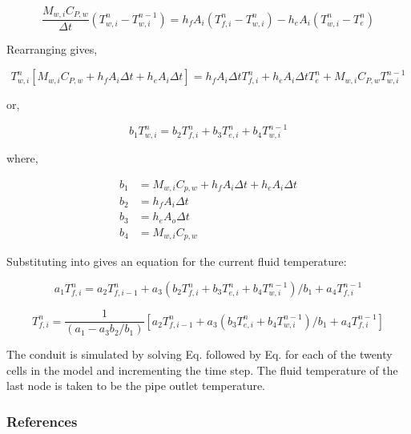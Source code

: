 \begin{equation}
\frac{{{M_{w,i}}{C_{P,w}}}}{{\Delta t}}\left( {T_{w,i}^n - T_{w,i}^{n - 1}} \right) = {h_f}{A_i}\left( {T_{f,i}^n - T_{w,i}^n} \right) - {h_e}{A_i}\left( {T_{w,i}^n - T_e^n} \right)
\end{equation}

Rearranging gives,

\begin{equation}
T_{w,i}^n\left[ {{M_{w,i}}{C_{P,w}} + {h_f}{A_i}\Delta t + {h_e}{A_i}\Delta t} \right] = {h_f}{A_i}\Delta tT_{f,i}^n + {h_e}{A_i}\Delta tT_e^n + {M_{w,i}}{C_{P,w}}T_{w,i}^{n - 1}
\end{equation}

or,

\begin{equation}
{b_1}T_{w,i}^n = {b_2}T_{f,i}^n + {b_3}T_{e,i}^n + {b_4}T_{w,i}^{n - 1}
\end{equation}

where,

\begin{equation}
  \begin{array}{rl}
    b_1 &= M_{w,i} C_{p,w} + h_f A_i \Delta t + h_e A_i \Delta t \\
    b_2 &= h_f A_i \Delta t \\
    b_3 &= h_e A_o \Delta t \\
    b_4 &= M_{w,i} C_{p,w}
  \end{array}
\end{equation}

Substituting into gives an equation for the current fluid temperature:

\begin{equation}
{a_1}T_{f,i}^n = {a_2}T_{f,i - 1}^n + {a_3}\left( {{b_2}T_{f,i}^n + {b_3}T_{e,i}^n + {b_4}T_{w,i}^{n - 1}} \right)/{b_1} + {a_4}T_{f,i}^{n - 1}
\end{equation}

\begin{equation}
T_{f,i}^n = \frac{1}{{\left( {{a_1} - {a_3}{b_2}/{b_1}} \right)}}\left[ {{a_2}T_{f,i - 1}^n + {a_3}\left( {{b_3}T_{e,i}^n + {b_4}T_{w,i}^{n - 1}} \right)/{b_1} + {a_4}T_{f,i}^{n - 1}} \right]
\end{equation}

The conduit is simulated by solving Eq. followed by Eq. for each of the twenty cells in the model and incrementing the time step. The fluid temperature of the last node is taken to be the pipe outlet temperature.

\subsubsection{References}\label{references-036}

